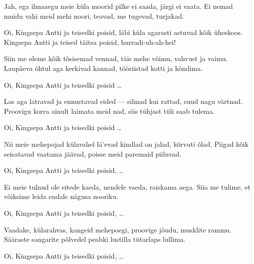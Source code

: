 Jah, ega ilmaaegu meie k\"ula moorid
pilke ei saada, j\"argi ei vaata.
Ei nemad muidu vahi meid mehi noori,
teavad, me tugevad, turjakad.

Oi, Kingsepa Antti ja teisedki poisid,
l\"abi k\"ula agarasti astuvad k\~oik \"uheskoos.
Kingsepa Antti ja teised t\"aitsa poisid,
hurradi-uh-ah-hei!

Siin me oleme k\~oik t\~osisemad vennad,
t\"ais mehe v\~oimu, vahvust ja vaimu.
Laup\"aeva \~ohtul aga kerkivad kannad,
t\"o\"oriistad kotti ja k\~ondima.

Oi, Kingsepa Antti ja teisedki poisid \ldots

Las aga latravad ja ennustavad eided ---
silmad kui rattad, suud nagu v\"artnad.
Proovigu korra ainult laimata meid nad,
siis t\"uhjast t\"uli saab tulema.

Oi, Kingsepa Antti ja teisedki poisid \ldots

Nii meie mehepojad k\"ulavahel l\"a'evad
kindlad on jalad, k\~orvuti \~olad.
Piigad k\~oik seisatavad vaatama j\"a\"avad,
poisse meid paremaid piiluvad.

Oi, Kingsepa Antti ja teisedki poisid, \ldots

Ei meie tulnud ole eitede kaeda,
nendele vaeda, raiskama aega.
Siia me tulime, et v\~oiksime leida
endale n\"agusa nooriku.

Oi, Kingsepa Antti ja teisedki poisid, \ldots

Vaadake, k\"ularahvas, kangeid mehepoegi,
proovige j\~oudu, musklite rammu.
S\"a\"araste sangarite p\~olvedel peabki
lustilla t\"utarlaps lullima.

Oi, Kingsepa Antti ja teisedki poisid, \ldots